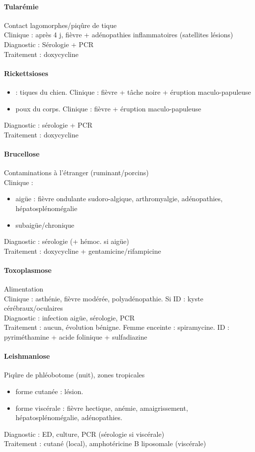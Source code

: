 \paragraph{Tularémie} Contact lagomorphes/piqûre de tique\\
Clinique : après 4 j, fièvre + adénopathies inflammatoires (satellites lésions)
Diagnostic : Sérologie + PCR\\
Traitement : doxycycline


\paragraph{Rickettsioses} 
\begin{itemize}
  \item {} : tiques du chien. Clinique : fièvre + tâche noire +
    éruption maculo-papuleuse
  \item {} poux du corps. Clinique : fièvre + éruption
    maculo-papuleuse
\end{itemize}
Diagnostic : sérologie + PCR\\
Traitement : doxycycline

\paragraph{Brucellose} Contaminations à l'étranger (ruminant/porcins)\\
Clinique :
\begin{itemize}
  \item aigüe : fièvre ondulante sudoro-algique, arthromyalgie, adénopathies,
    hépatosplénomégalie
  \item subaigüe/chronique
\end{itemize}
Diagnostic : sérologie (+ hémoc. si aigüe)\\
Traitement : doxycycline + gentamicine/rifampicine

\paragraph{Toxoplasmose} Alimentation\\
Clinique : asthénie, fièvre modérée, polyadénopathie. Si ID : kyste
cérébraux/oculaires\\
Diagnostic : infection aigüe, sérologie, PCR\\
Traitement : aucun, évolution bénigne. Femme enceinte : spiramycine. ID :
pyriméthamine + acide folinique + sulfadiazine

\paragraph{Leishmaniose} Piqûre de phléobotome (nuit), zones tropicales
\begin{itemize}
  \item forme cutanée : lésion. 
  \item forme viscérale : fièvre hectique, anémie, amaigrissement,
    hépatosplénomégalie, adénopathies.
\end{itemize}
Diagnostic : ED, culture, PCR (sérologie si viscérale)\\
Traitement : cutané (local), amphotéricine B liposomale (viscérale)

